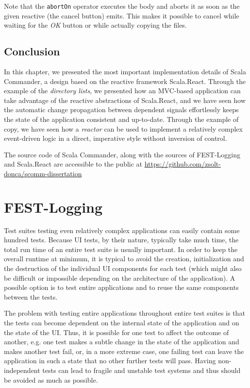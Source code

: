 Note that the \texttt{abortOn} operator executes the body and aborts it as soon as the given reactive (the cancel button) emits. This makes it possible to cancel while waiting for the \emph{OK} button or while actually copying the files.


\section{Conclusion}

In this chapter, we presented the most important implementation details of Scala Commander, a design based on the reactive framework Scala.React. Through the example of the \emph{directory lists}, we presented how an MVC-based application can take advantage of the reactive abstractions of Scala.React, and we have seen how the automatic change propagation between dependent signals effortlessly keeps the state of the application consistent and up-to-date. Through the example of copy, we have seen how a \emph{reactor} can be used to implement a relatively complex event-driven logic in a direct, imperative style without inversion of control. 

The source code of Scala Commander, along with the sources of FEST-Logging and Scala.React are accessible to the public at \url{https://github.com/zsolt-donca/scomm-dissertation}


\chapter{FEST-Logging}\label{chap:impl_fest-logging}

Test suites testing even relatively complex applications can easily contain some hundred tests. Because UI tests, by their nature, typically take much time, the total run time of an entire test suite is usually important. In order to keep the overall runtime at minimum, it is typical to avoid the creation, initialization and the destruction of the individual UI components for each test (which might also be difficult or impossible depending on the architecture of the application). A possible option is to test entire applications and to reuse the same components between the tests.

The problem with testing entire applications throughout entire test suites is that the tests can become dependent on the internal state of the application and on the state of the UI. Thus, it is possible for one test to affect the outcome of another, e.g. one test makes a subtle change in the state of the application and makes another test fail, or, in a more extreme case, one failing test can leave the application in such a state that no other further tests will pass. Having non-independent tests can lead to fragile and unstable test systems and thus should be avoided as much as possible.

